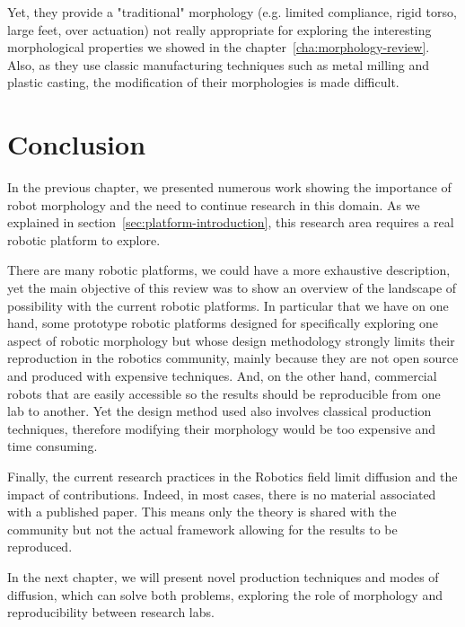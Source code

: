 Yet, they provide a "traditional" morphology (e.g. limited compliance, rigid torso, large feet, over actuation) not really appropriate for exploring the interesting morphological properties we showed in the chapter~\ref{cha:morphology-review}. Also, as they use classic manufacturing techniques such as metal milling and plastic casting, the modification of their morphologies is made difficult.

\section{Conclusion}

In the previous chapter, we presented numerous work showing the importance of robot morphology and the need to continue research in this domain. As we explained in section~\ref{sec:platform-introduction},  this research area requires a real robotic platform to explore.

There are many robotic platforms, we could have a more exhaustive description, yet the main objective of this review was to show an overview of the landscape of possibility with the current robotic platforms. In particular that we have on one hand, some prototype robotic platforms designed for specifically exploring one aspect of robotic morphology but whose design methodology strongly limits their reproduction in the robotics community, mainly because they are not open source and produced with expensive techniques.
And, on the other hand, commercial robots that are easily accessible so the results should be reproducible from one lab to another. Yet the design method used also involves classical production techniques, therefore modifying their morphology would be too expensive and time consuming.

Finally, the current research practices in the Robotics field limit diffusion and the impact of contributions.
Indeed, in most cases, there is no material associated with a published paper.
This means only the theory is shared with the community but not the actual framework allowing for the results to be reproduced.

In the next chapter, we will present novel production techniques and modes of diffusion, which can solve both problems, exploring the role of morphology and reproducibility between research labs.






